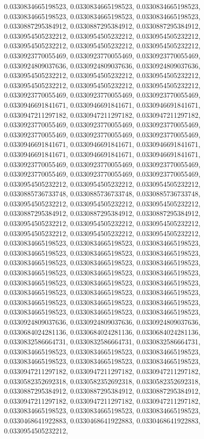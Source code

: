 \documentclass[
  ,man]{apa6}
\begin{document}
0.0330834665198523, 0.0330834665198523, 0.0330834665198523, 0.0330834665198523, 0.0330834665198523, 0.0330834665198523, 0.0330887295384912, 0.0330887295384912, 0.0330887295384912, 0.0330954505232212, 0.0330954505232212, 0.0330954505232212, 0.0330954505232212, 0.0330954505232212, 0.0330954505232212, 0.0330923770055469, 0.0330923770055469, 0.0330923770055469, 0.0330924809037636, 0.0330924809037636, 0.0330924809037636, 0.0330954505232212, 0.0330954505232212, 0.0330954505232212, 0.0330954505232212, 0.0330954505232212,
0.0330954505232212, 0.0330923770055469, 0.0330923770055469, 0.0330923770055469, 0.0330946691841671, 0.0330946691841671, 0.0330946691841671, 0.0330947211297182, 0.0330947211297182, 0.0330947211297182, 0.0330923770055469, 0.0330923770055469, 0.0330923770055469, 0.0330923770055469, 0.0330923770055469, 0.0330923770055469, 0.0330946691841671, 0.0330946691841671, 0.0330946691841671, 0.0330946691841671, 0.0330946691841671, 0.0330946691841671, 0.0330923770055469, 0.0330923770055469, 0.0330923770055469, 0.0330923770055469,
0.0330923770055469, 0.0330923770055469, 0.0330954505232212, 0.0330954505232212, 0.0330954505232212, 0.0330885736733748, 0.0330885736733748, 0.0330885736733748, 0.0330954505232212, 0.0330954505232212, 0.0330954505232212, 0.0330887295384912, 0.0330887295384912, 0.0330887295384912, 0.0330954505232212, 0.0330954505232212, 0.0330954505232212, 0.0330954505232212, 0.0330954505232212, 0.0330954505232212, 0.0330834665198523, 0.0330834665198523, 0.0330834665198523, 0.0330834665198523, 0.0330834665198523, 0.0330834665198523,
0.0330834665198523, 0.0330834665198523, 0.0330834665198523, 0.0330834665198523, 0.0330834665198523, 0.0330834665198523, 0.0330834665198523, 0.0330834665198523, 0.0330834665198523, 0.0330834665198523, 0.0330834665198523, 0.0330834665198523, 0.0330834665198523, 0.0330834665198523, 0.0330834665198523, 0.0330834665198523, 0.0330834665198523, 0.0330834665198523, 0.0330924809037636, 0.0330924809037636, 0.0330924809037636, 0.0330684024281136, 0.0330684024281136, 0.0330684024281136, 0.0330832586664731, 0.0330832586664731,
0.0330832586664731, 0.0330834665198523, 0.0330834665198523, 0.0330834665198523, 0.0330834665198523, 0.0330834665198523, 0.0330834665198523, 0.0330947211297182, 0.0330947211297182, 0.0330947211297182, 0.0330582352692318, 0.0330582352692318, 0.0330582352692318, 0.0330887295384912, 0.0330887295384912, 0.0330887295384912, 0.0330947211297182, 0.0330947211297182, 0.0330947211297182, 0.0330834665198523, 0.0330834665198523, 0.0330834665198523, 0.0330468641922883, 0.0330468641922883, 0.0330468641922883, 0.0330954505232212,
\end{document}
